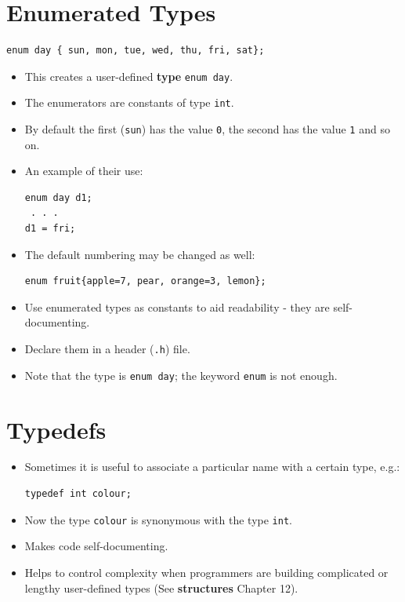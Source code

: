\documentclass[a4,portraitt]{slides}
\begin{document}
\section*{Enumerated Types}

{\small
\begin{verbatim}
enum day { sun, mon, tue, wed, thu, fri, sat};
\end{verbatim}
}

\begin{itemize}
\item This creates a user-defined {\bf type} \verb^enum day^.
\item The enumerators are constants of type \verb^int^.
\item By default the first (\verb^sun^) has the value \verb^0^,
the second has the value \verb^1^ and so on.
\item An example of their use:
\begin{verbatim}
enum day d1;
 . . .
d1 = fri;
\end{verbatim}
\item The default numbering may be changed as well:
{\small
\begin{verbatim}
enum fruit{apple=7, pear, orange=3, lemon};
\end{verbatim}
}
\item Use enumerated types as constants to aid readability -
they are self-documenting.
\item Declare them in a header (\verb^.h^) file.
\item Note that the type is \verb^enum day^; the
keyword \verb^enum^ is not enough.
\end{itemize}

\newpage
\section*{Typedefs}
\begin{itemize}
\item Sometimes it is useful to associate a particular name with
a certain type, e.g.:
\begin{verbatim}
typedef int colour;
\end{verbatim}
\item Now the type \verb^colour^ is synonymous with the type \verb^int^.
\item Makes code self-documenting.
\item Helps to control complexity when programmers are building
complicated or lengthy user-defined types (See {\bf structures} Chapter 12).
\end{itemize}
\end{document}

